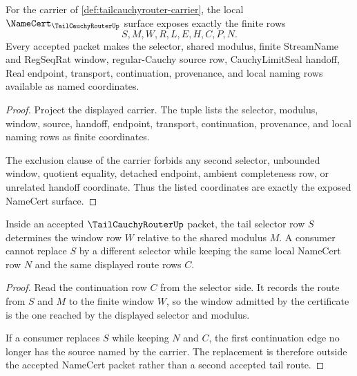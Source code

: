\begin{theorem}
\label{thm:tailcauchyrouter-carrier-exposure}
For the carrier of \autoref{def:tailcauchyrouter-carrier}, the local $\NameCert_{\TailCauchyRouterUp}$ surface exposes exactly the finite rows
$$
S,M,W,R,L,E,H,C,P,N.
$$
Every accepted packet makes the selector, shared modulus, finite StreamName and RegSeqRat window, regular-Cauchy source row, CauchyLimitSeal handoff, Real endpoint, transport, continuation, provenance, and local naming rows available as named coordinates.
\end{theorem}
\begin{proof}
Project the displayed carrier. The tuple lists the selector, modulus, window, source, handoff, endpoint, transport, continuation, provenance, and local naming rows as finite coordinates.

The exclusion clause of the carrier forbids any second selector, unbounded window, quotient equality, detached endpoint, ambient completeness row, or unrelated handoff coordinate. Thus the listed coordinates are exactly the exposed NameCert surface.
\end{proof}

\begin{theorem}
\label{thm:tailcauchyrouter-selector-determinacy}
Inside an accepted $\TailCauchyRouterUp$ packet, the tail selector row $S$ determines the window row $W$ relative to the shared modulus $M$. A consumer cannot replace $S$ by a different selector while keeping the same local NameCert row $N$ and the same displayed route rows $C$.
\end{theorem}
\begin{proof}
Read the continuation row $C$ from the selector side. It records the route from $S$ and $M$ to the finite window $W$, so the window admitted by the certificate is the one reached by the displayed selector and modulus.

If a consumer replaces $S$ while keeping $N$ and $C$, the first continuation edge no longer has the source named by the carrier. The replacement is therefore outside the accepted NameCert packet rather than a second accepted tail route.
\end{proof}

